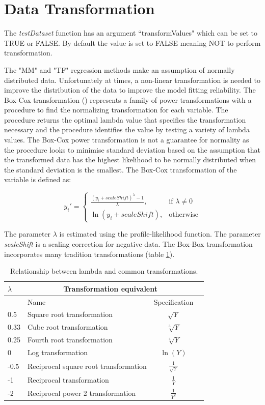\documentclass[12pt,a4paper]{article}
\begin{document}
\section{Data Transformation}
\label{section:transformation}
The \textit{testDataset} function has an argument “transformValues" which can be set to TRUE or FALSE. By default the value is set to FALSE meaning NOT to perform transformation.

The "MM" and "TF" regression methods make an assumption of normally distributed data. Unfortunately at times, a non-linear transformation is needed to improve the distribution of the data to improve the model fitting reliability. 
The Box-Cox transformation (\cite{BoxCox}) represents a family of power transformations with a procedure to find the normalizing transformation for each variable. The procedure returns the optimal lambda value that specifies the transformation necessary and the procedure identifies the value by testing a variety of lambda values. The Box-Cox power transformation is not a guarantee for normality as the procedure looks to minimise standard deviation based on the assumption that the transformed data has the highest likelihood to be normally distributed when the standard deviation is the smallest. 
The Box-Cox transformation of the variable is defined as:

\begin{equation}
  y_i'=\begin{cases}
    \frac{(y_i + scaleShift)^\lambda - 1}{\lambda}, & \text{if $\lambda \neq 0$}\\
    \ln(y_i + scaleShift), & \text{otherwise}
  \end{cases}
\end{equation}

The parameter $\lambda$ is estimated using the profile-likelihood function. The parameter \textit{scaleShift} is a scaling correction for negative data.
The Box-Box transformation incorporates many tradition transformations (table \ref{table:tr1}). 
\begin{table}[!h]
\begin{center}
\begin{tabular}{| l | l | c | c |}
  \hline
$\lambda$&\multicolumn{2}{|c|}{Transformation equivalent}\\\hline
&Name&Specification\\\hline
0.5&Square root transformation&$\sqrt{Y}$\\
0.33&Cube root transformation&$\sqrt[3]{Y}$\\
0.25&Fourth root transformation&$\sqrt[4]{Y}$\\
0&Log transformation&$\ln(Y)$\\
-0.5&Reciprocal square root transformation&$\frac{1}{\sqrt{Y}}$\\
-1&Reciprocal transformation&$\frac{1}{Y}$\\
-2&Reciprocal power 2 transformation&$\frac{1}{Y^2}$\\
\hline  
\end{tabular}
\caption{Relationship between lambda and common transformations.}\label{table:tr1}
\end{center}
\end{table}
\end{document}
